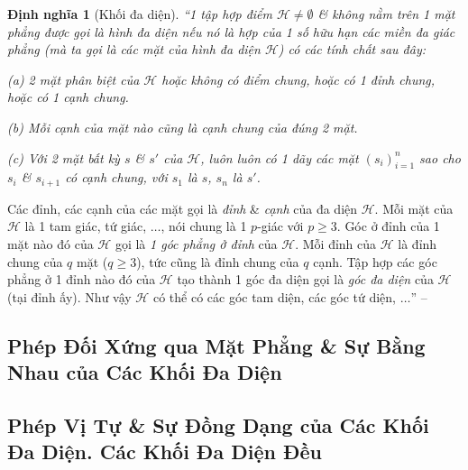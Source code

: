 \documentclass{article}
\numberwithin{equation}{section}
\newtheorem{dinhnghia}{Định nghĩa}[section]
\begin{document}
\begin{dinhnghia}[Khối đa diện]
	``1 tập hợp điểm $\mathcal{H}\ne\emptyset$ \& không nằm trên 1 mặt phẳng được gọi là \emph{hình đa diện} nếu nó là hợp của 1 số hữu hạn các miền đa giác phẳng (mà ta gọi là các \emph{mặt của hình đa diện} $\mathcal{H}$) có các tính chất sau đây:
	\begin{enumerate*}
		\item[(a)] 2 mặt phân biệt của $\mathcal{H}$ hoặc không có điểm chung, hoặc có 1 đỉnh chung, hoặc có 1 cạnh chung.
		\item[(b)] Mỗi cạnh của mặt nào cũng là cạnh chung của đúng 2 mặt.
		\item[(c)] Với 2 mặt bất kỳ $s$ \& $s'$ của $\mathcal{H}$, luôn luôn có 1 dãy các mặt $(s_i)_{i=1}^n$ sao cho $s_i$ \& $s_{i+1}$ có cạnh chung, với $s_1$ là $s$, $s_n$ là $s'$.
	\end{enumerate*}
\end{dinhnghia}
Các đỉnh, các cạnh của các mặt gọi là \textit{đỉnh} \& \textit{cạnh} của đa diện $\mathcal{H}$. Mỗi mặt của $\mathcal{H}$ là 1 tam giác, tứ giác, $\ldots$, nói chung là 1 $p$-giác với $p\ge 3$. Góc ở đỉnh của 1 mặt nào đó của $\mathcal{H}$ gọi là \textit{1 góc phẳng ở đỉnh} của $\mathcal{H}$. Mỗi đỉnh của $\mathcal{H}$ là đỉnh chung của $q$ mặt ($q\ge 3$), tức cũng là đỉnh chung của $q$ cạnh. Tập hợp các góc phẳng ở 1 đỉnh nào đó của $\mathcal{H}$ tạo thành 1 góc đa diện gọi là \textit{góc đa diện} của $\mathcal{H}$ (tại đỉnh ấy). Như vậy $\mathcal{H}$ có thể có các góc tam diện, các góc tứ diện, $\ldots$'' -- \cite[p. 5]{TL_chuyen_Toan_Hinh_Hoc_12}


\subsection{Phép Đối Xứng qua Mặt Phẳng \& Sự Bằng Nhau của Các Khối Đa Diện}


\subsection{Phép Vị Tự \& Sự Đồng Dạng của Các Khối Đa Diện. Các Khối Đa Diện Đều}

\end{document}
